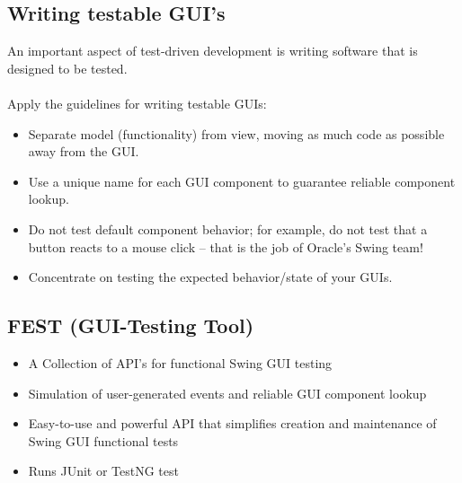 \documentclass[a4paper,10pt]{article}
\begin{document}
\subsection{Writing testable GUI's}
An important aspect of test-driven development is writing software that is designed to be tested.\\
\\
Apply the guidelines for writing testable GUIs:
\begin{itemize}
\item Separate model (functionality) from view, moving as much code as possible away from the GUI.
\item Use a unique name for each GUI component to guarantee reliable component lookup.
\item Do not test default component behavior; for example, do not test that a button reacts to a mouse click -- that is the job of Oracle’s Swing team!
\item Concentrate on testing the expected behavior/state of your GUIs.
\end{itemize}

\subsection{FEST (GUI-Testing Tool)}
\begin{itemize}
\item A Collection of API’s for functional Swing GUI testing
\item Simulation of user-generated events and reliable GUI component lookup
\item Easy-to-use and powerful API that simplifies creation and maintenance of Swing GUI functional tests
\item Runs JUnit or TestNG test
\end{itemize}
\end{document}

